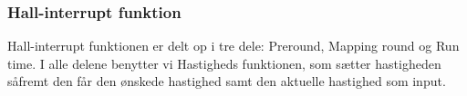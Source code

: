 \subsubsection{Hall-interrupt funktion}

Hall-interrupt funktionen er delt op i tre dele: Preround, Mapping round og Run time.  I alle delene benytter vi Hastigheds funktionen, som sætter hastigheden såfremt den får den ønskede hastighed samt den aktuelle hastighed som input.


